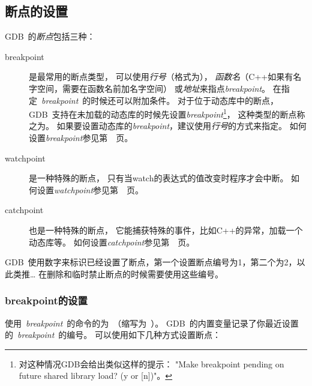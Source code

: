 \subsection{断点的设置}
GDB~的\emph{断点}包括三种：
\begin{description}
\item[breakpoint] 是最常用的断点类型，
可以使用\emph{行号}（格式为），
\emph{函数名}（C++如果有名字空间，需要在函数名前加名字空间）
或\emph{地址}来指点\emph{breakpoint}。
在指定~\emph{breakpoint}~的时候还可以附加条件。
对于位于动态库中的断点，
GDB~支持在未加载的动态库的时候先设置\emph{breakpoint}\footnote{
对这种情况GDB会给出类似这样的提示：
"Make breakpoint pending on future shared library load? (y or [n])"。}，
这种类型的断点称之为。
如果要设置动态库的\emph{breakpoint}，建议使用\emph{行号}的方式来指定。
如何设置\emph{breakpoint}参见第~\pageref{sec:gdb_breakpoint}~页。

\item[watchpoint] 是一种特殊的断点，
只有当watch的表达式的值改变时程序才会中断。
如何设置\emph{watchpoint}参见第~\pageref{sec:gdb_watchpoint}~页。

\item[catchpoint] 也是一种特殊的断点，
它能捕获特殊的事件，比如C++的异常，加载一个动态库等。
如何设置\emph{catchpoint}参见第~\pageref{sec:gdb_catchpoint}~页。
\end{description}

GDB~使用数字来标识已经设置了断点，第一个设置断点编号为1，第二个为2，以此类推\ldots
在删除和临时禁止断点的时候需要使用这些编号。

\subsubsection{breakpoint的设置}
\label{sec:gdb_breakpoint} 
使用~\emph{breakpoint}~的命令的为~（缩写为~）。
GDB~的内置变量记录了你最近设置的~\emph{breakpoint}~的编号。
可以使用如下几种方式设置断点：

\noindent
{}


\noindent
{}


